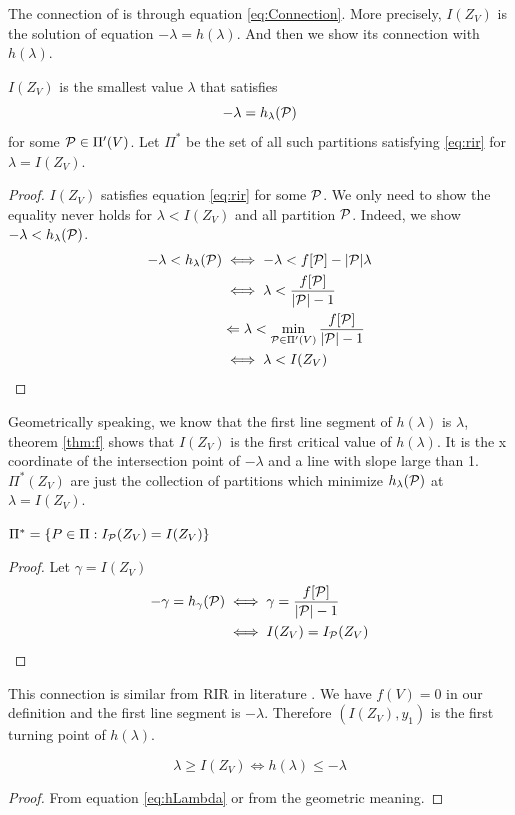 \documentclass{article}
\begin{document}
The connection of  is through equation \eqref{eq:Connection}. More precisely, $I(Z_V)$
is the solution of equation $-\lambda = h(\lambda)$.
And then we show its connection with $h(\lambda)$.
\begin{theorem}\label{thm:f}
$I(Z_V)$ is the smallest value $\lambda$ that satisfies
\begin{equation}\label{eq:rir}
-\lambda = h_{\lambda}(\P)
\end{equation}
for some $\P \in \Pi'(V)$. Let $\Pi^*$ be the set of all such partitions satisfying \eqref{eq:rir}
for $\lambda = I(Z_V)$.
\end{theorem}
\begin{proof}
$I(Z_V)$ satisfies equation \eqref{eq:rir} for some $\P$. We only need to show the equality never holds for $\lambda < I(Z_V)$ and all partition $\P$. Indeed, we show $-\lambda < h_{\lambda}(\P)$.
\begin{align*}
-\lambda < h_{\lambda}(\P) &\iff -\lambda < f[\P] - \abs{\P} \lambda \\
& \iff \lambda < \frac{ f[\P] }{ \abs{\P} - 1 } \\
& \Leftarrow \lambda < \min_{\P \in \Pi'(V)} \frac{f[\P]}{  \abs{\P} - 1 } \\
& \iff \lambda < I(Z_V)
\end{align*}
\end{proof}
\begin{remark}
Geometrically speaking, we know that the first line segment of $h(\lambda)$ is $\lambda$, theorem \ref{thm:f} shows that $I(Z_V)$ is the first critical value of $h(\lambda)$. It is the x coordinate of the intersection point of $-\lambda$ and a line with slope large than 1. $\Pi^*(Z_V) $ are just the collection of partitions which minimize $h_{\lambda}(\P)$ at $\lambda = I(Z_V)$.
\end{remark}

\begin{corollary}\label{cor:F}
$\Pi^*= \{ P \in \Pi: I_{\P}(Z_V) = I(Z_V)\}$
\end{corollary}
\begin{proof}
Let $\gamma = I(Z_V)$
\begin{align*}
-\gamma = h_{\gamma}(\P) & \iff  \gamma = { f[\P] \over \abs{\P} - 1 } \\
& \iff I(Z_V) = I_{\P}(Z_V)
\end{align*}
\end{proof}
This connection is similar from RIR in literature \cite{ic}. We have $f(V)=0$ in our definition and the first line segment is $-\lambda$. Therefore
$(I(Z_V),  y_1)$ is the first turning point of $h(\lambda)$.
\begin{corollary}\label{cor:large}
	\begin{equation}
	\lambda \geq I(Z_V) \iff h(\lambda) \leq -\lambda
	\end{equation}
\end{corollary}
\begin{proof}
	From equation \eqref{eq:hLambda} or from the geometric meaning.
\end{proof}
\end{document}
